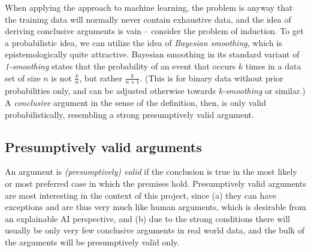 When applying the approach to machine learning, the problem is anyway that the training data will normally never contain exhaustive data, and the idea of deriving conclusive arguments is vain -- consider the problem of induction. To get a probabilistic idea, we can utilize the idea of \textit{Bayesian smoothing}, which is epistemologically quite attractive. Bayesian smoothing in its standard variant of \textit{1-smoothing} states that the probability of an event that occurs $k$ times in a data set of size $n$ is not $\frac{k}{n}$, but rather $\frac{k}{n+1}$. (This is for binary data without prior probabilities only, and can be adjusted otherwise towards \textit{k-smoothing} or similar.) A \textit{conclusive} argument in the sense of the definition, then, is only valid probabilistically, resembling a strong presumptively valid argument.

\subsection*{Presumptively valid arguments}

An argument is \textit{(presumptively) valid} if the conclusion is true in the most likely or most preferred case in which the premises hold. Presumptively valid arguments are most interesting in the context of this project, since (a) they can have exceptions and are thus very much like human arguments, which is desirable from an explainable AI perspective, and (b) due to the strong conditions there will usually be only very few conclusive arguments in real world data, and the bulk of the arguments will be presumptively valid only. 
